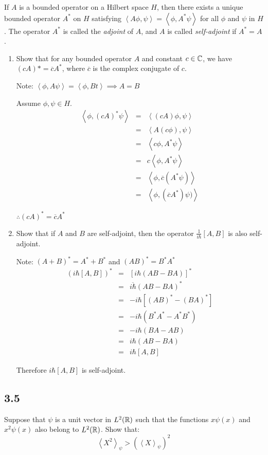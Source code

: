 \documentclass[letterpaper,12pt,fleqn]{article}
\newcommand{\p}{\phi}
\renewcommand{\t}{\psi}
\newcommand{\ihb}{i\hbar}
\newcommand{\inner}[1]{\left<#1\right>}
\newcommand{\conj}[1]{\overline{#1}}
\begin{document}
If $A$ is a bounded operator on a Hilbert space $H$, then there exists a unique
bounded operator $A^*$ on $H$ satisfying $\inner{A\p,\t}=\inner{\p,A^*\t}$ for
all $\p$ and $\t$ in $H$. The operator $A^*$ is called the \emph{adjoint} of
$A$, and $A$ is called \emph{self-adjoint} if $A^*=A$.
\begin{enumerate}[label=(\alph*)]
\item Show that for any bounded operator $A$ and constant $c\in\mathbb{C}$, we have
  $(cA)*=\conj{c}A^*$, where $\conj{c}$ is the complex conjugate of $c$.

  Note: $\inner{\p,A\t}=\inner{\p,Bt}\implies A=B$
  
  Assume $\p,\t\in H$.
  \begin{eqnarray*}
    \inner{\p,(cA)^*\t} &=& \inner{(cA)\p,\t} \\
    &=& \inner{A(c\p),\t} \\
    &=& \inner{c\p,A^*\t} \\
    &=& c\inner{\p,A^*\t} \\
    &=& \inner{\p,\conj{c}(A^*\t)} \\
    &=& \inner{\p,(\conj{c}A^*)\t)}
  \end{eqnarray*}

  $\therefore(cA)^*=\conj{c}A^*$

\item Show that if $A$ and $B$ are self-adjoint, then the operator
  $\frac{1}{\ihb}[A,B]$ is also self-adjoint.

  Note: $(A+B)^*=A^*+B^*$ and $(AB)^*=B^*A^*$
  \begin{eqnarray*}
    (\ihb[A,B])^* &=& [\ihb(AB-BA)]^* \\
    &=& \conj{\ihb}(AB-BA)^* \\
    &=& -\ihb[(AB)^*-(BA)^*] \\
    &=& -\ihb(B^*A^*-A^*B^*) \\
    &=& -\ihb(BA-AB) \\
    &=& \ihb(AB-BA) \\
    &=& \ihb[A,B]
  \end{eqnarray*}

  Therefore $\ihb[A,B]$ is self-adjoint.
\end{enumerate}

\subsection*{3.5}

Suppose that $\t$ is a unit vector in $L^2(\mathbb{R})$ such that the functions
$x\t(x)$ and $x^2\t(x)$ also belong to $L^2(\mathbb{R})$. Show that:
\[\inner{X^2}_{\t}>\left(\inner{X}_{\t}\right)^2\]
\end{document}

